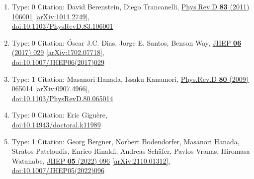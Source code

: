 \documentclass[a4paper,10pt]{article}
\begin{document}
\begin{enumerate}
\begin{enumerate}
  \item Type: 0 Citation: David Berenstein, Diego Trancanelli, \href{https://www.doi.org/10.1103/PhysRevD.83.106001}{Phys.Rev.D {\bf 83} (2011) 106001}  \href{https://arxiv.org/abs/1011.2749}{[arXiv:1011.2749]},\\\href{https://www.doi.org/10.1103/PhysRevD.83.106001}{doi:10.1103/PhysRevD.83.106001}
  \item Type: 0 Citation: Óscar J.C. Dias, Jorge E. Santos, Benson Way, \href{https://www.doi.org/10.1007/JHEP06(2017)029}{JHEP {\bf 06} (2017) 029}  \href{https://arxiv.org/abs/1702.07718}{[arXiv:1702.07718]},\\\href{https://www.doi.org/10.1007/JHEP06(2017)029}{doi:10.1007/JHEP06(2017)029}
  \item Type: 1 Citation: Masanori Hanada, Issaku Kanamori, \href{https://www.doi.org/10.1103/PhysRevD.80.065014}{Phys.Rev.D {\bf 80} (2009) 065014}  \href{https://arxiv.org/abs/0907.4966}{[arXiv:0907.4966]},\\\href{https://www.doi.org/10.1103/PhysRevD.80.065014}{doi:10.1103/PhysRevD.80.065014}
  \item Type: 0 Citation: Eric Giguère,\\\href{https://www.doi.org/10.14943/doctoral.k11989}{doi:10.14943/doctoral.k11989}
  \item Type: 1 Citation: Georg Bergner, Norbert Bodendorfer, Masanori Hanada, Stratos Pateloudis, Enrico Rinaldi, Andreas Schäfer, Pavlos Vranas, Hiromasa Watanabe, \href{https://www.doi.org/10.1007/JHEP05(2022)096}{JHEP {\bf 05} (2022) 096}  \href{https://arxiv.org/abs/2110.01312}{[arXiv:2110.01312]},\\\href{https://www.doi.org/10.1007/JHEP05(2022)096}{doi:10.1007/JHEP05(2022)096}

\end{enumerate}
\end{enumerate}
\end{document}
